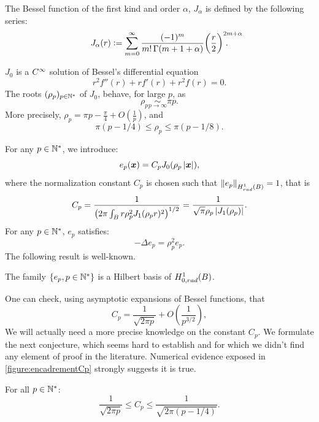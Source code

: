 \documentclass[smallextended]{svjour3}
\begin{document}
\begin{definition}
	\label{defJ0}
	The Bessel function of the first kind and order $\alpha$, $J_\alpha$ is defined by the following series: 
	\begin{equation}
		\label{J0powerSeries}
		J_\alpha(r) \isdef \sum_{m=0}^\infty \frac{(-1)^m}{m! \, \Gamma(m+1+\alpha)} {\bigg(\frac{r}{2}\bigg)}^{2m+\alpha}\!\!\!\!\!\!\!\!\!\!\!\!.
	\end{equation}
\end{definition}
\noindent $J_0$ is a $C^{\infty}$ solution of Bessel's differential equation 
\begin{equation}
	\label{BesselDifferentialEquation}
	r^2f''(r) + r f'(r) + r^2 f(r) = 0.
\end{equation}
The roots $(\rho_p)_{p \in \mathbb{N}^*}$ of $J_0$, behave, for large $p$, as 
\[ \rho_p \underset{p \to \infty}{\sim} \pi p.\]
More precisely, $\rho_p = \pi p - \frac{\pi}{4} + O\left(\frac{1}{p}\right)$, and
\begin{equation}
	\pi(p - 1/4)\leq \rho_p \leq \pi(p - 1/8).
	\label{EncadrementRhop}
\end{equation}

\noindent For any $p\in \mathbb{N}^*$, we introduce:
\[e_p(\boldsymbol{x}) = C_p J_0(\rho_p \left\lvert \boldsymbol{x} \right\rvert),\]
where the normalization constant $C_p$ is chosen such that $\left\|e_p\right\|_{H^1_{rad}(B)} = 1$, that is  
\[C_p = \dfrac{1}{\left(2\pi \int_B  r \rho_p^2 J_1 (\rho_p r)^2\right)^{1/2}} = \dfrac{1}{\sqrt{\pi}\rho_p\left\lvert J_1(\rho_p) \right\rvert}.\]
\noindent For any $p \in \mathbb{N}^*$, $e_p$ satisfies:
\begin{equation}
	\label{epEstUnVP}
	-\Delta e_p = \rho_p^2 e_p.
\end{equation}
The following result is well-known.
\begin{theorem} 
	\label{epEstUneBaseDeHilbert}
	The family $\left\{e_p, p\in \mathbb{N}^*\right\}$ is a Hilbert basis of $H^1_{0,rad}(B)$.
\end{theorem}

One can check, using asymptotic expansions of Bessel functions, that
\begin{equation}
	\label{equivalentCp}
	C_p = \dfrac{1}{\sqrt{2 \pi p}} + O\left(\frac{1}{p^{3/2}}\right), 
\end{equation}
We will actually need a more precise knowledge on the constant $C_p$. We formulate the next conjecture, which seems hard to establish and for which we didn't find any element of proof in the literature. Numerical evidence exposed in \autoref{figure:encadrementCp} strongly suggests it is true. 
\begin{conjecture} 
	\label{ConjCp}
	For all $p \in \mathbb{N}^*$:
	\begin{equation}
		\label{EncadrementCp}
		\frac{1}{\sqrt{2\pi p}} \leq C_p \leq \frac{1}{\sqrt{2\pi (p-1/4)}}.
	\end{equation}
\end{conjecture}
\end{document}
